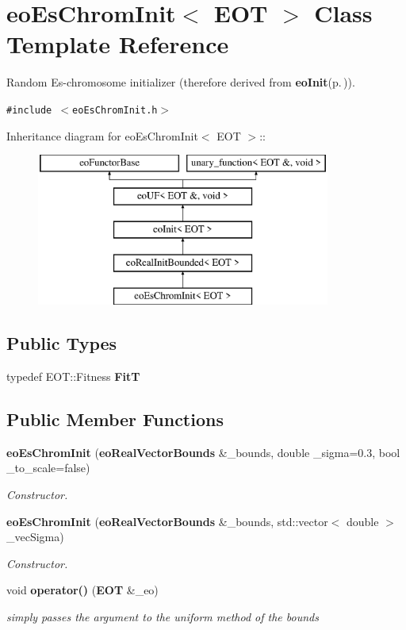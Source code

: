 \section{eo\-Es\-Chrom\-Init$<$ EOT $>$ Class Template Reference}
\label{classeo_es_chrom_init}
Random Es-chromosome initializer (therefore derived from {\bf eo\-Init}{\rm (p.\,\pageref{classeo_init})}).  


{\tt \#include $<$eo\-Es\-Chrom\-Init.h$>$}

Inheritance diagram for eo\-Es\-Chrom\-Init$<$ EOT $>$::\begin{figure}[H]
\begin{center}
\leavevmode
\includegraphics[height=5cm]{classeo_es_chrom_init}
\end{center}
\end{figure}
\subsection*{Public Types}
\begin{CompactItemize}
\item 
typedef EOT::Fitness {\bf Fit\-T}\label{classeo_es_chrom_init_w0}

\end{CompactItemize}
\subsection*{Public Member Functions}
\begin{CompactItemize}
\item 
{\bf eo\-Es\-Chrom\-Init} ({\bf eo\-Real\-Vector\-Bounds} \&\_\-bounds, double \_\-sigma=0.3, bool \_\-to\_\-scale=false)
\begin{CompactList}\small\item\em Constructor. \item\end{CompactList}\item 
{\bf eo\-Es\-Chrom\-Init} ({\bf eo\-Real\-Vector\-Bounds} \&\_\-bounds, std::vector$<$ double $>$ \_\-vec\-Sigma)
\begin{CompactList}\small\item\em Constructor. \item\end{CompactList}\item 
void {\bf operator()} ({\bf EOT} \&\_\-eo)\label{classeo_es_chrom_init_a2}

\begin{CompactList}\small\item\em simply passes the argument to the uniform method of the bounds \item\end{CompactList}\end{CompactItemize}
